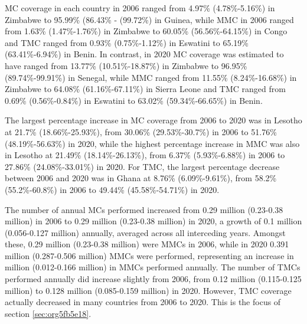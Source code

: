 \documentclass{article}
\begin{document}
MC coverage in each country in 2006 ranged from 4.97\% (4.78\%-5.16\%) in Zimbabwe to 95.99\% (86.43\% -
(99.72\%) in Guinea, while MMC in 2006 ranged from 1.63\% (1.47\%-1.76\%) in Zimbabwe to 60.05\% (56.56\%-64.15\%) in Congo and TMC ranged from 0.93\% (0.75\%-1.12\%) in Eswatini to 65.19\% (63.41\%-6.94\%)
in Benin. In contrast, in 2020 MC coverage was estimated to have ranged from 13.77\% (10.51\%-18.87\%) in
Zimbabwe to 96.95\% (89.74\%-99.91\%) in Senegal, while MMC ranged from 11.55\% (8.24\%-16.68\%) in
Zimbabwe to 64.08\% (61.16\%-67.11\%) in Sierra Leone and TMC ranged from 0.69\% (0.56\%-0.84\%) in
Eswatini to 63.02\% (59.34\%-66.65\%) in Benin.

The largest percentage increase in MC coverage from 2006 to 2020 was in Lesotho at 21.7\% (18.66\%-25.93\%),
from 30.06\% (29.53\%-30.7\%) in 2006 to 51.76\% (48.19\%-56.63\%) in 2020, while the highest percentage
increase in MMC was also in Lesotho at 21.49\% (18.14\%-26.13\%), from 6.37\% (5.93\%-6.88\%) in 2006 to
27.86\% (24.08\%-33.01\%) in 2020. For TMC, the largest percentage decrease between 2006 and 2020 was in
Ghana at 8.76\% (6.09\%-9.61\%), from 58.2\% (55.2\%-60.8\%) in 2006 to 49.44\% (45.58\%-54.71\%) in 2020.

The number of annual MCs performed increased from 0.29 million (0.23-0.38 million) in 2006 to 0.29 million
(0.23-0.38 million) in 2020, a growth of 0.1 million (0.056-0.127 million) annually, averaged across all
interceding years. Amongst these, 0.29 million (0.23-0.38 million) were MMCs in 2006, while in 2020 0.391
million (0.287-0.506 million) MMCs were performed, representing an increase in million (0.012-0.166
million) in MMCs performed annually. The number of TMCs performed annually did increase slightly from
2006, from 0.12 million (0.115-0.125 million) to 0.128 million (0.085-0.159 million) in 2020. However,
TMC coverage actually decreased in many countries from 2006 to 2020. This is the focus of section \ref{sec:org5fb5e18}.
\end{document}
